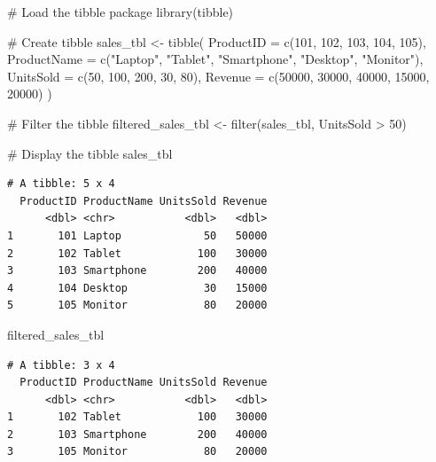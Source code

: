 \documentclass[
  letterpaper,
  DIV=11,
  numbers=noendperiod]{scrreprt}
\newenvironment{Shaded}{\begin{snugshade}}{\end{snugshade}}
\newcommand{\AttributeTok}[1]{\textcolor[rgb]{0.40,0.45,0.13}{#1}}
\newcommand{\CommentTok}[1]{\textcolor[rgb]{0.37,0.37,0.37}{#1}}
\newcommand{\DecValTok}[1]{\textcolor[rgb]{0.68,0.00,0.00}{#1}}
\newcommand{\FunctionTok}[1]{\textcolor[rgb]{0.28,0.35,0.67}{#1}}
\newcommand{\NormalTok}[1]{\textcolor[rgb]{0.00,0.23,0.31}{#1}}
\newcommand{\OtherTok}[1]{\textcolor[rgb]{0.00,0.23,0.31}{#1}}
\newcommand{\SpecialCharTok}[1]{\textcolor[rgb]{0.37,0.37,0.37}{#1}}
\newcommand{\StringTok}[1]{\textcolor[rgb]{0.13,0.47,0.30}{#1}}
\begin{document}
\begin{Shaded}
\begin{Highlighting}[]
\CommentTok{\# Load the tibble package}
\FunctionTok{library}\NormalTok{(tibble)}

\CommentTok{\# Create tibble}
\NormalTok{sales\_tbl }\OtherTok{\textless{}{-}} \FunctionTok{tibble}\NormalTok{(}
  \AttributeTok{ProductID =} \FunctionTok{c}\NormalTok{(}\DecValTok{101}\NormalTok{, }\DecValTok{102}\NormalTok{, }\DecValTok{103}\NormalTok{, }\DecValTok{104}\NormalTok{, }\DecValTok{105}\NormalTok{),}
  \AttributeTok{ProductName =} \FunctionTok{c}\NormalTok{(}\StringTok{"Laptop"}\NormalTok{, }\StringTok{"Tablet"}\NormalTok{, }\StringTok{"Smartphone"}\NormalTok{, }\StringTok{"Desktop"}\NormalTok{, }\StringTok{"Monitor"}\NormalTok{),}
  \AttributeTok{UnitsSold =} \FunctionTok{c}\NormalTok{(}\DecValTok{50}\NormalTok{, }\DecValTok{100}\NormalTok{, }\DecValTok{200}\NormalTok{, }\DecValTok{30}\NormalTok{, }\DecValTok{80}\NormalTok{),}
  \AttributeTok{Revenue =} \FunctionTok{c}\NormalTok{(}\DecValTok{50000}\NormalTok{, }\DecValTok{30000}\NormalTok{, }\DecValTok{40000}\NormalTok{, }\DecValTok{15000}\NormalTok{, }\DecValTok{20000}\NormalTok{)}
\NormalTok{)}

\CommentTok{\# Filter the tibble}
\NormalTok{filtered\_sales\_tbl }\OtherTok{\textless{}{-}} \FunctionTok{filter}\NormalTok{(sales\_tbl, UnitsSold }\SpecialCharTok{\textgreater{}} \DecValTok{50}\NormalTok{)}

\CommentTok{\# Display the tibble}
\NormalTok{sales\_tbl}
\end{Highlighting}
\end{Shaded}

\begin{verbatim}
# A tibble: 5 x 4
  ProductID ProductName UnitsSold Revenue
      <dbl> <chr>           <dbl>   <dbl>
1       101 Laptop             50   50000
2       102 Tablet            100   30000
3       103 Smartphone        200   40000
4       104 Desktop            30   15000
5       105 Monitor            80   20000
\end{verbatim}

\begin{Shaded}
\begin{Highlighting}[]
\NormalTok{filtered\_sales\_tbl}
\end{Highlighting}
\end{Shaded}

\begin{verbatim}
# A tibble: 3 x 4
  ProductID ProductName UnitsSold Revenue
      <dbl> <chr>           <dbl>   <dbl>
1       102 Tablet            100   30000
2       103 Smartphone        200   40000
3       105 Monitor            80   20000
\end{verbatim}
\end{document}

